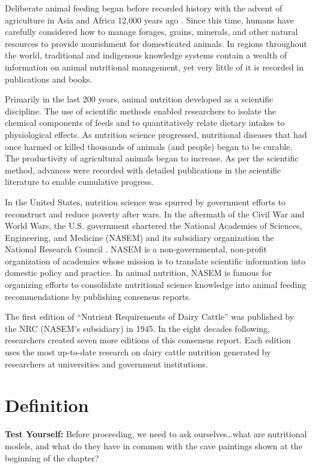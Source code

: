 \documentclass[
]{book}
\begin{document}
Deliberate animal feeding began before recorded history with the advent of agriculture in Asia and Africa 12,000 years ago \citep{Coffey2016}. Since this time, humans have carefully considered how to manage forages, grains, minerals, and other natural resources to provide nourishment for domesticated animals. In regions throughout the world, traditional and indigenous knowledge systems contain a wealth of information on animal nutritional management, yet very little of it is recorded in publications and books.

Primarily in the last 200 years, animal nutrition developed as a scientific discipline. The use of scientific methods enabled researchers to isolate the chemical components of feeds and to quantitatively relate dietary intakes to physiological effects. As nutrition science progressed, nutritional diseases that had once harmed or killed thousands of animals (and people) began to be curable. The productivity of agricultural animals began to increase. As per the scientific method, advances were recorded with detailed publications in the scientific literature to enable cumulative progress.

In the United States, nutrition science was spurred by government efforts to reconstruct and reduce poverty after wars. In the aftermath of the Civil War and World Wars, the U.S. government chartered the National Academies of Sciences, Engineering, and Medicine (NASEM) and its subsidiary organization the National Research Council \citep[NRC,][]{Ullrey2001}. NASEM is a non-governmental, non-profit organization of academics whose mission is to translate scientific information into domestic policy and practice. In animal nutrition, NASEM is famous for organizing efforts to consolidate nutritional science knowledge into animal feeding recommendations by publishing consensus reports.

The first edition of ``Nutrient Requirements of Dairy Cattle'' was published by the NRC (NASEM's subsidiary) in 1945. In the eight decades following, researchers created seven more editions of this consensus report. Each edition uses the most up-to-date research on dairy cattle nutrition generated by researchers at universities and government institutions.

\hypertarget{definition}{%
\section{Definition}\label{definition}}

\textbf{Test Yourself: }
Before proceeding, we need to ask ourselves\ldots what are nutritional models, and what do they have in common with the cave paintings shown at the beginning of the chapter?
\end{document}
